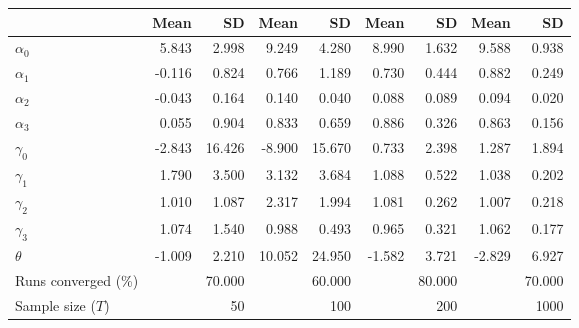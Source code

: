 
\begin{tabular}[t]{lrrrrrrrr}
\toprule
  & Mean & SD & Mean  & SD  & Mean   & SD   & Mean    & SD   \\
\midrule
$\alpha_{0}$ & 5.843 & 2.998 & 9.249 & 4.280 & 8.990 & 1.632 & 9.588 & 0.938\\
$\alpha_{1}$ & -0.116 & 0.824 & 0.766 & 1.189 & 0.730 & 0.444 & 0.882 & 0.249\\
$\alpha_{2}$ & -0.043 & 0.164 & 0.140 & 0.040 & 0.088 & 0.089 & 0.094 & 0.020\\
$\alpha_{3}$ & 0.055 & 0.904 & 0.833 & 0.659 & 0.886 & 0.326 & 0.863 & 0.156\\
$\gamma_{0}$ & -2.843 & 16.426 & -8.900 & 15.670 & 0.733 & 2.398 & 1.287 & 1.894\\
$\gamma_{1}$ & 1.790 & 3.500 & 3.132 & 3.684 & 1.088 & 0.522 & 1.038 & 0.202\\
$\gamma_{2}$ & 1.010 & 1.087 & 2.317 & 1.994 & 1.081 & 0.262 & 1.007 & 0.218\\
$\gamma_{3}$ & 1.074 & 1.540 & 0.988 & 0.493 & 0.965 & 0.321 & 1.062 & 0.177\\
$\theta$ & -1.009 & 2.210 & 10.052 & 24.950 & -1.582 & 3.721 & -2.829 & 6.927\\
Runs converged (\%) &  & 70.000 &  & 60.000 &  & 80.000 &  & 70.000\\
Sample size ($T$) &  & 50 &  & 100 &  & 200 &  & 1000\\
\bottomrule
\end{tabular}
